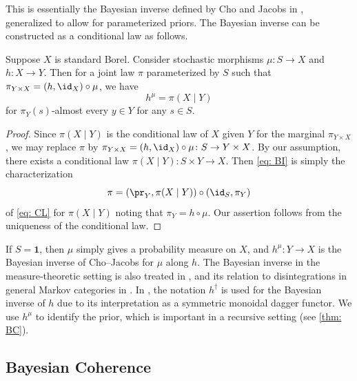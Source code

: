 \documentclass[12pt,reqno]{amsart}%
\theoremstyle{plain}
\theoremstyle{definition}
\def\bsone{\boldsymbol{1}}
\begin{document}
This is essentially the Bayesian inverse defined by Cho and Jacobs in \cite[\S3]{CJ19},
generalized to allow for parameterized priors.  
The Bayesian inverse can be constructed as a conditional law as follows.

\begin{proposition}\label{prop: construct}
	Suppose $X$ is standard Borel.
	Consider stochastic morphisms $\mu\colon S\rightarrow X$ and $h\colon X\rightarrow Y$.
	Then for a joint law $\pi$ parameterized by $S$ such that $\pi_{Y\times X}=(h,\id_X)\circ\mu$,
	we have
	\[
		h^\mu=\pi(X\mid Y)
	\]
	for $\pi_Y(s)$-almost every $y\in Y$ for any $s\in S$.
\end{proposition}

\begin{proof}
	Since $\pi(X\mid Y)$ is the conditional law of $X$ given $Y$ for the marginal $\pi_{Y\times X}$,
	we may replace $\pi$ by $\pi_{Y\times X}=(h,\id_X)\circ\mu\colon S\rightarrow Y\times X$.
	By our assumption, there exists
	a conditional law $\pi(X\mid Y)\colon S\times Y\rightarrow X$.
	Then \eqref{eq: BI} is simply the characterization
	\[
		\pi=(\pr_Y, \pi(X\mid Y))\circ (\id_S,\pi_Y)
	\]
	of \eqref{eq: CL} for $\pi(X\mid Y)$ noting that $\pi_Y=h\circ\mu$.
	Our assertion follows from the uniqueness of the conditional law.
\end{proof}

If $S=\bsone$, then $\mu$ simply gives a probability measure on $X$, and $h^\mu\colon Y\to X$ is the Bayesian inverse of Cho--Jacobs \cite{CJ19} for $\mu$ along $h$.
The Bayesian inverse in the measure-theoretic setting is also treated in \cite{CS14},
and its relation to disintegrations in general Markov categories in \cite{P20}.
In \cite[Remark 13.10]{F20},
the notation $h^\dagger$ is used for the Bayesian inverse of $h$ due to its interpretation
as a symmetric monoidal dagger functor.  We use $h^\mu$
to identify the prior, which is important in a recursive setting (see \cref{thm: BC}).

%
\subsection{Bayesian Coherence}
%
\end{document}

